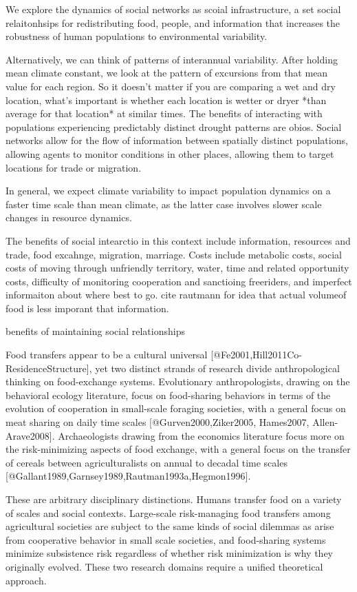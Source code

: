 \documentclass[fleqn,10pt]{wlscirep}
\begin{document}
We explore the dynamics of social networks as scoial infrastructure, a set social relaitonhsips for redistributing food, people, and information that increases the robustness of human populations to environmental variability.


Alternatively, we can think of patterns of interannual variability. After holding mean climate constant, we look at the pattern of excursions from that mean value for each region. So it doesn't matter if you are comparing a wet and dry location, what's important is whether each location is wetter or dryer *than average for that location* at similar times. The benefits of interacting with populations experiencing predictably distinct drought patterns are obios. Social networks allow for the flow of information between spatially distinct populations, allowing agents to monitor conditions in other places, allowing them to target locations for trade or migration.

In general, we expect climate variability to impact population dynamics on a faster time scale than mean climate, as the latter case involves slower scale changes in resource dynamics.

The benefits of social intearctio in this context include information, resources and trade, food excahnge, migration, marriage. Costs include metabolic costs, social costs of moving through unfriendly territory, water, time and related opportunity costs, difficulty of monitoring cooperation and sanctioing freeriders, and imperfect informaiton about where best to go. cite rautmann for idea that actual volumeof food is less imporant that information.

benefits of maintaining social relationships

Food transfers appear to be a cultural universal [@Fe2001,Hill2011Co-ResidenceStructure], yet two distinct strands of research divide anthropological thinking on food-exchange systems. Evolutionary anthropologists, drawing on the behavioral ecology literature, focus on food-sharing behaviors in terms of the evolution of cooperation in small-scale foraging societies, with a general focus on meat sharing on daily time scales [@Gurven2000,Ziker2005, Hames2007, Allen-Arave2008].  Archaeologists drawing from the economics literature focus more on the risk-minimizing aspects of food exchange, with a general focus on the transfer of cereals between agriculturalists on annual to decadal time scales [@Gallant1989,Garnsey1989,Rautman1993a,Hegmon1996].

These are arbitrary disciplinary distinctions. Humans transfer food on a variety of scales and social contexts. Large-scale risk-managing food transfers among agricultural societies are subject to the same kinds of social dilemmas as arise from cooperative behavior in small scale societies, and food-sharing systems minimize subsistence risk regardless of whether risk minimization is why they originally evolved. These two research domains require a unified theoretical approach.
\end{document}
